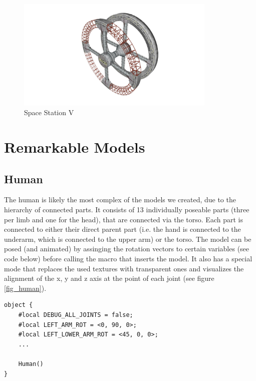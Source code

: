 \begin{figure}[ht]
	\centering
	\includegraphics[width=0.85\textwidth]{images/station.jpg}
	\caption{Space Station V}
	\label{station}
\end{figure}

\section{Remarkable Models}

\subsection{Human} \label{human_model}

The human is likely the most complex of the models we created, due to the hierarchy of connected parts.
It consists of 13 individually poseable parts (three per limb and one for the head), that are connected via the torso.
Each part is connected to either their direct parent part (i.e. the hand is connected to the underarm, which is connected to the upper arm) or the torso.
The model can be posed (and animated) by assinging the rotation vectors to certain variables (see code below) before calling the macro that inserts the model.
It also has a special mode that replaces the used textures with transparent ones and visualizes the alignment of the x, y and z axis at the point of each joint (see figure \ref{fig_human}).

\begin{lstlisting}
object {
    #local DEBUG_ALL_JOINTS = false;
    #local LEFT_ARM_ROT = <0, 90, 0>;
    #local LEFT_LOWER_ARM_ROT = <45, 0, 0>;
    ...

    Human()
}
\end{lstlisting}

